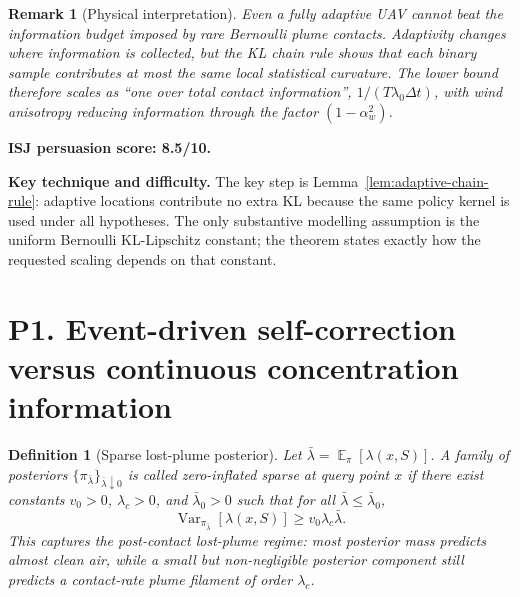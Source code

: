 \documentclass[11pt]{article}
\newtheorem{definition}[theorem]{Definition}
\newtheorem{remark}[theorem]{Remark}
\DeclareMathOperator{\E}{\mathbb{E}}
\DeclareMathOperator{\Var}{\mathrm{Var}}
\newcommand{\dt}{\Delta t}
\begin{document}
\begin{remark}[Physical interpretation]
Even a fully adaptive UAV cannot beat the information budget imposed by rare Bernoulli plume contacts.  Adaptivity changes where information is collected, but the KL chain rule shows that each binary sample contributes at most the same local statistical curvature.  The lower bound therefore scales as ``one over total contact information'', $1/(T\lambda_0\dt)$, with wind anisotropy reducing information through the factor $(1-\alpha_w^2)$.
\end{remark}

\noindent\textbf{ISJ persuasion score: 8.5/10.}

\noindent\textbf{Key technique and difficulty.}
The key step is Lemma~\ref{lem:adaptive-chain-rule}: adaptive locations contribute no extra KL because the same policy kernel is used under all hypotheses.  The only substantive modelling assumption is the uniform Bernoulli KL-Lipschitz constant; the theorem states exactly how the requested scaling depends on that constant.

\section{P1. Event-driven self-correction versus continuous concentration information}

\begin{definition}[Sparse lost-plume posterior]\label{def:sparse-posterior}
Let $\bar{\lambda}=\E_{\pi}[\lambda(x,S)]$.  A family of posteriors $\{\pi_{\bar{\lambda}}\}_{\bar{\lambda}\downarrow 0}$ is called \emph{zero-inflated sparse} at query point $x$ if there exist constants $v_0>0$, $\lambda_c>0$, and $\bar{\lambda}_0>0$ such that for all $\bar{\lambda}\leq\bar{\lambda}_0$,
\begin{equation}
        \Var_{\pi_{\bar{\lambda}}}[\lambda(x,S)]
        \geq
        v_0\lambda_c\bar{\lambda}.
        \label{eq:zero-inflated-variance}
\end{equation}
This captures the post-contact lost-plume regime: most posterior mass predicts almost clean air, while a small but non-negligible posterior component still predicts a contact-rate plume filament of order $\lambda_c$.
\end{definition}
\end{document}
